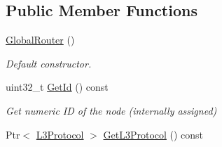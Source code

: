 \subsection*{Public Member Functions}
\begin{DoxyCompactItemize}
\item 
\hyperlink{classns3_1_1ndn_1_1GlobalRouter_ae46a993b3572c38759766b9766c0db6b}{Global\+Router} ()\hypertarget{classns3_1_1ndn_1_1GlobalRouter_ae46a993b3572c38759766b9766c0db6b}{}\label{classns3_1_1ndn_1_1GlobalRouter_ae46a993b3572c38759766b9766c0db6b}

\begin{DoxyCompactList}\small\item\em Default constructor. \end{DoxyCompactList}\item 
uint32\+\_\+t \hyperlink{classns3_1_1ndn_1_1GlobalRouter_adc4eaf5709935674f16212e52a6b5e15}{Get\+Id} () const\hypertarget{classns3_1_1ndn_1_1GlobalRouter_adc4eaf5709935674f16212e52a6b5e15}{}\label{classns3_1_1ndn_1_1GlobalRouter_adc4eaf5709935674f16212e52a6b5e15}

\begin{DoxyCompactList}\small\item\em Get numeric ID of the node (internally assigned) \end{DoxyCompactList}\item 
Ptr$<$ \hyperlink{classns3_1_1ndn_1_1L3Protocol}{L3\+Protocol} $>$ \hyperlink{classns3_1_1ndn_1_1GlobalRouter_a367dfea691e4173f14fd1d63e5107d27}{Get\+L3\+Protocol} () const\hypertarget{classns3_1_1ndn_1_1GlobalRouter_a367dfea691e4173f14fd1d63e5107d27}{}\label{classns3_1_1ndn_1_1GlobalRouter_a367dfea691e4173f14fd1d63e5107d27}


\end{DoxyCompactItemize}
